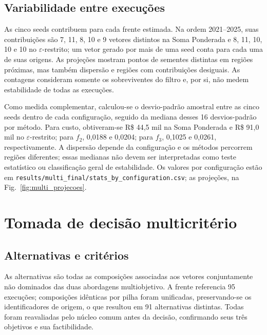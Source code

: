 \documentclass[10pt,twocolumn,a4paper]{article}
\begin{document}
\subsection{Variabilidade entre execuções}

As cinco seeds contribuem para cada frente estimada. Na ordem 2021--2025, suas contribuições são 7, 11, 8, 10 e 9 vetores distintos na Soma Ponderada e 8, 11, 10, 10 e 10 no $\varepsilon$-restrito; um vetor gerado por mais de uma seed conta para cada uma de suas origens. As projeções mostram pontos de sementes distintas em regiões próximas, mas também dispersão e regiões com contribuições desiguais. As contagens consideram somente os sobreviventes do filtro e, por si, não medem estabilidade de todas as execuções.

Como medida complementar, calculou-se o desvio-padrão amostral entre as cinco seeds dentro de cada configuração, seguido da mediana desses 16 desvios-padrão por método. Para custo, obtiveram-se R\$ 44,5 mil na Soma Ponderada e R\$ 91,0 mil no $\varepsilon$-restrito; para $f_2$, 0,0188 e 0,0204; para $f_3$, 0,1025 e 0,0261, respectivamente. A dispersão depende da configuração e os métodos percorrem regiões diferentes; essas medianas não devem ser interpretadas como teste estatístico ou classificação geral de estabilidade. Os valores por configuração estão em \texttt{results/multi\_final/stats\_by\_configuration.csv}; as projeções, na Fig.~\ref{fig:multi_projecoes}.

\section{Tomada de decisão multicritério}

\subsection{Alternativas e critérios}

As alternativas são todas as composições associadas aos vetores conjuntamente não dominados das duas abordagens multiobjetivo. A frente referencia 95 execuções; composições idênticas por pilha foram unificadas, preservando-se os identificadores de origem, o que resultou em 91 alternativas distintas. Todas foram reavaliadas pelo núcleo comum antes da decisão, confirmando seus três objetivos e sua factibilidade.
\end{document}
